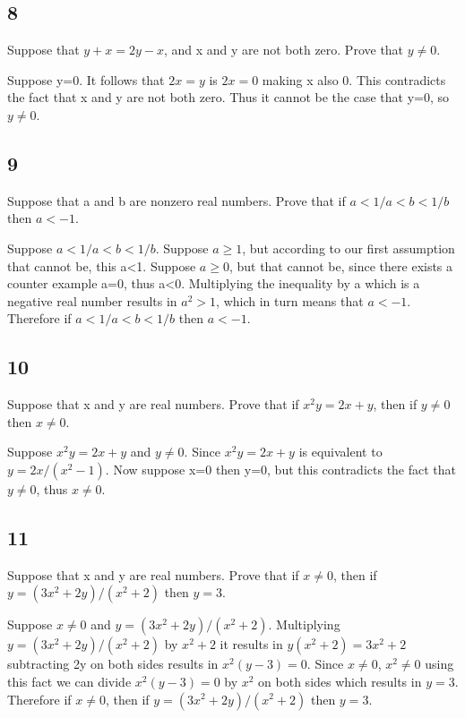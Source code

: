 \documentclass{article}
\begin{document}
\subsection{8}
Suppose that $y+x=2y-x$, and x and y are not both zero. Prove that $y \neq 0$.

Suppose y=0. It follows that $2x=y$ is $2x=0$ making x also 0. This contradicts the fact that x and y are not both zero. Thus it cannot be the case that y=0, so $y\neq 0$.
\subsection{9}
Suppose that a and b are nonzero real numbers. Prove that if $a<1/a<b<1/b$ then $a<-1$.

Suppose $a<1/a<b<1/b$. Suppose $a\geq 1$, but according to our first assumption that cannot be, this a<1. Suppose $a \geq 0$, but that cannot be, since there exists a counter example a=0, thus a<0. Multiplying the inequality by a which is a negative real number results in $a^2 >1$, which in turn means that $a<-1$. Therefore if  $a<1/a<b<1/b$ then $a<-1$.
\subsection{10}
Suppose that x and y are real numbers. Prove that if $x^2 y=2x + y$, then if $y \neq 0$ then $x \neq 0$.

Suppose $x^2 y=2x + y$ and $y \neq 0$. Since $x^2 y=2x + y$ is equivalent to $y=2x/(x^2-1)$. Now suppose x=0 then y=0, but this contradicts the fact that $y \neq 0$, thus $x \neq 0$.

\subsection{11}
Suppose that x and y are real numbers. Prove that if  $x \neq 0$, then if  $y= (3x^2 + 2y )/(x^2 + 2)$ then $y = 3$.

Suppose $x \neq 0$ and $y= (3x^2 + 2y )/(x^2 + 2)$. Multiplying $y= (3x^2 + 2y )/(x^2 + 2)$ by $x^2 +2$ it results in $y(x^2 +2)=3x^2+2$ subtracting 2y on both sides results in $x^2(y-3)=0$. Since $x\neq 0$, $x^2\neq 0$ using this fact we can divide $x^2(y-3)=0$ by $x^2$ on both sides which results in $y=3$. Therefore if $x \neq 0$, then if  $y= (3x^2 + 2y )/(x^2 + 2)$ then $y = 3$.
\end{document}
